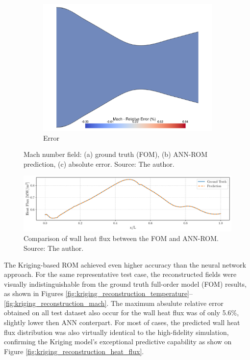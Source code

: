 \documentclass[tg, EN]{ufabcFHZh_tg}
\begin{document}
\begin{figure}[H]
\begin{subfigure}[b]{0.32\textwidth}
        \includegraphics[width=\textwidth]{Figuras/nn_error_mach.pdf}
        \caption{Error}
    \end{subfigure}
    \caption{Mach number field: (a) ground truth (FOM), (b) ANN-ROM prediction, (c) absolute error. Source: The author.}
    \label{fig:nn_reconstruction_mach}
\end{figure}

\begin{figure}[H]
    \centering
    \includegraphics[width=\textwidth]{Figuras/nn_heat_flux.pdf}
    \caption{Comparison of wall heat flux between the FOM and ANN-ROM. Source: The author.}
    \label{fig:nn_reconstruction_heat_flux}
\end{figure}

The Kriging-based ROM achieved even higher accuracy than the neural network approach. For the same representative test case, the reconstructed fields were visually indistinguishable from the ground truth full-order model (FOM) results, as shown in Figures \ref{fig:kriging_reconstruction_temperature}--\ref{fig:kriging_reconstruction_mach}. The maximum absulute relative error obtained on all test dataset also occur for the wall heat flux was of only 5.6\%, slightly lower then ANN conterpart. For most of cases, the predicted wall heat flux distribution was also virtually identical to the high-fidelity simulation, confirming the Kriging model's exceptional predictive capability as show on Figure \ref{fig:kriging_reconstruction_heat_flux}.
\end{document}
